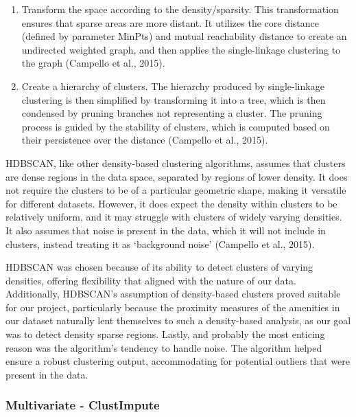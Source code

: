 \documentclass[11pt, a4paper]{article}
\begin{document}
\begin{enumerate}
\item Transform the space according to the density/sparsity. This transformation ensures that sparse areas are more distant. It utilizes the core distance (defined by parameter MinPts) and mutual reachability distance to create an undirected weighted graph, and then applies the single-linkage clustering to the graph (Campello et al., 2015).
\item Create a hierarchy of clusters. The hierarchy produced by single-linkage clustering is then simplified by transforming it into a tree, which is then condensed by pruning branches not representing a cluster. The pruning process is guided by the stability of clusters, which is computed based on their persistence over the distance (Campello et al., 2015).
\end{enumerate}

HDBSCAN, like other density-based clustering algorithms, assumes that clusters are dense regions in the data space, separated by regions of lower density. It does not require the clusters to be of a particular geometric shape, making it versatile for different datasets. However, it does expect the density within clusters to be relatively uniform, and it may struggle with clusters of widely varying densities. It also assumes that noise is present in the data, which it will not include in clusters, instead treating it as `background noise' (Campello et al., 2015).
\par
HDBSCAN was chosen because of its ability to detect clusters of varying densities, offering flexibility  that  aligned  with  the nature of our data. Additionally, HDBSCAN's  assumption of density-based clusters proved suitable for our project, particularly because the proximity measures of the amenities in our dataset naturally lent themselves to such a density-based analysis, as our goal was to detect density sparse regions. Lastly, and probably  the  most enticing reason was the algorithm’s tendency to handle noise. The algorithm helped ensure a robust clustering output, accommodating for potential outliers that were present in the data.









\subsubsection{Multivariate - ClustImpute}
\end{document}
